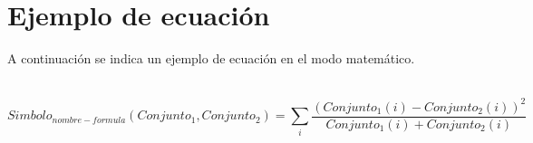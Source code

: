 \documentclass[12pt]{article}
\begin{document}
\newpage
\section{Ejemplo de ecuación}
A continuación se indica un ejemplo de ecuación en el modo matemático.\\
\\ \lipsum[1-2]

\begin{center}
	\begin{equation}	
		Simbolo_{nombre-formula} (Conjunto_1, Conjunto_2) = \sum_{i}\frac{(Conjunto_1(i)-Conjunto_2(i))^2}{Conjunto_1(i)+Conjunto_2(i)}	
	\end{equation}
\end{center}

\newpage


\end{document}
